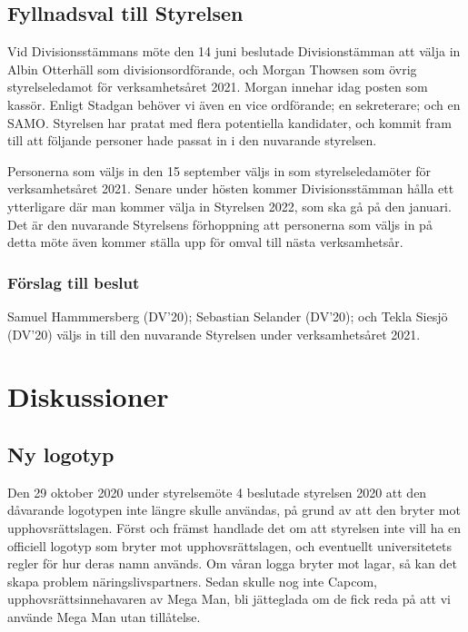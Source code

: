 \documentclass[protokoll]{dvd}
\begin{document}
\newpage
\subsection{Fyllnadsval till Styrelsen}

Vid Divisionsstämmans möte den 14 juni beslutade Divisionstämman att välja in Albin Otterhäll som divisionsordförande, och Morgan Thowsen som övrig styrelseledamot för verksamhetsåret 2021.
Morgan innehar idag posten som kassör.
Enligt Stadgan behöver vi även en vice ordförande; en sekreterare; och en SAMO.
Styrelsen har pratat med flera potentiella kandidater, och kommit fram till att följande personer hade passat in i den nuvarande styrelsen.

Personerna som väljs in den 15 september väljs in som styrelseledamöter för verksamhetsåret 2021.
Senare under hösten kommer Divisionsstämman hålla ett ytterligare där man kommer välja in Styrelsen 2022, som ska gå på den januari.
Det är den nuvarande Styrelsens förhoppning att personerna som väljs in på detta möte även kommer ställa upp för omval till nästa verksamhetsår.

\subsubsection*{Förslag till beslut}

\begin{attsatser}
	\item Samuel Hammmersberg (DV'20); Sebastian Selander (DV'20); och Tekla Siesjö (DV'20) väljs in till den nuvarande Styrelsen under verksamhetsåret 2021.
\end{attsatser}

\newpage
\section{Diskussioner}\label{sec:discussioner}

\subsection{Ny logotyp}

Den 29 oktober 2020 under styrelsemöte 4 beslutade styrelsen 2020 att den dåvarande logotypen inte längre skulle användas, på grund av att den bryter mot upphovsrättslagen.
Först och främst handlade det om att styrelsen inte vill ha en officiell logotyp som bryter mot upphovsrättslagen, och eventuellt universitetets regler för hur deras namn används.
Om våran logga bryter mot lagar, så kan det skapa problem näringslivspartners.
Sedan skulle nog inte Capcom, upphovsrättsinnehavaren av Mega Man, bli jätteglada om de fick reda på att vi använde Mega Man utan tillåtelse.
\end{document}
